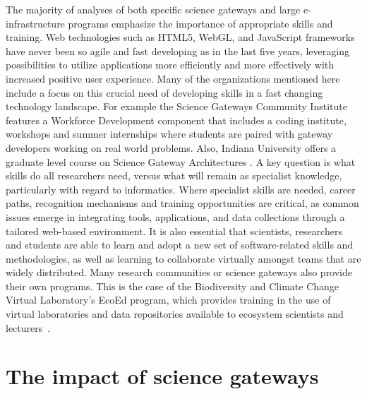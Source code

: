 \documentclass[review]{elsarticle}
\begin{document}
The majority of analyses of both specific science gateways and large e-infrastructure programs emphasize the importance of appropriate skills and training. Web technologies such as HTML5, WebGL, and JavaScript frameworks have never been so agile and fast developing as in the last five years, leveraging possibilities to utilize applications more efficiently and more effectively with increased positive user experience. 
Many of the organizations mentioned here include a focus on this crucial need of developing skills in a fast changing technology landscape. 
For example the Science Gateways Community Institute features a Workforce Development component that includes a coding institute, workshops and summer internships where students are paired with gateway developers working on real world problems. Also, Indiana University offers a graduate level course on Science Gateway Architectures \cite{course-86}. 
A key question is what skills do all researchers need, versus what will remain as specialist knowledge, particularly with regard to informatics. Where specialist skills are needed, career paths, recognition mechanisms and training opportunities are critical, as common issues emerge in integrating tools, applications, and data collections through a tailored web-based environment. 
It is also essential that scientists, researchers and students are able to learn and adopt a new set of software-related skills and methodologies, as well as learning to collaborate virtually amongst teams that are widely distributed. 
Many research communities or science gateways also provide their own programs. This is the case of the Biodiversity and Climate Change Virtual Laboratory's EcoEd program, which provides training in the use of virtual laboratories and data repositories available to ecosystem scientists and lecturers~\cite{ecoed-81}. 


\section{The impact of science gateways}
\end{document}
